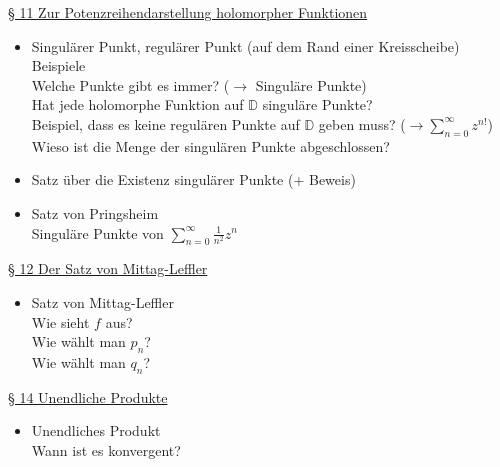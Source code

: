 \documentclass[11pt]{article}
\newcommand{\D}{\mathbb{D}}
\begin{document}
\underline{§ 11 Zur Potenzreihendarstellung holomorpher Funktionen}
\vspace{-0.5cm}
\begin{itemize}
\item Singulärer Punkt, regulärer Punkt (auf dem Rand einer Kreisscheibe) \\
\quad Beispiele \\
\quad Welche Punkte gibt es immer? ($\rightarrow$ Singuläre Punkte) \\
\quad Hat jede holomorphe Funktion auf $\D$ singuläre Punkte? \\
\quad Beispiel, dass es keine regulären Punkte auf $\D$ geben muss? ($\rightarrow \sum_{n=0}^\infty z^{n!}$) \\
\quad Wieso ist die Menge der singulären Punkte abgeschlossen?
\item Satz über die Existenz singulärer Punkte (+ Beweis)
\item Satz von Pringsheim \\
\quad Singuläre Punkte von $\sum_{n=0}^\infty \frac{1}{n^2}z^n$
\end{itemize}

\underline{§ 12 Der Satz von Mittag-Leffler}
\vspace{-0.5cm}
\begin{itemize}
\item Satz von Mittag-Leffler \\
\quad Wie sieht $f$ aus? \\
\quad Wie wählt man $p_n$? \\
\quad Wie wählt man $q_n$? 
\end{itemize}

\underline{§ 14 Unendliche Produkte}
\vspace{-0.5cm}
\begin{itemize}
\item Unendliches Produkt \\
\quad Wann ist es konvergent?
\end{itemize}
\end{document}
